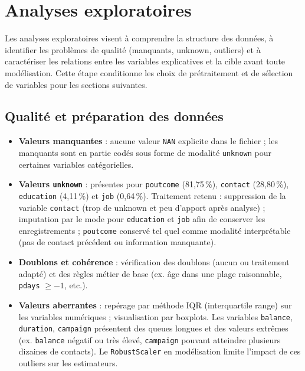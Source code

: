 \documentclass[11pt,a4paper]{article}
\begin{document}
\section{Analyses exploratoires}

Les analyses exploratoires visent à comprendre la structure des données, à identifier les problèmes de qualité (manquants, unknown, outliers) et à caractériser les relations entre les variables explicatives et la cible avant toute modélisation. Cette étape conditionne les choix de prétraitement et de sélection de variables pour les sections suivantes.

\subsection{Qualité et préparation des données}
\begin{itemize}
  \item \textbf{Valeurs manquantes} : aucune valeur \texttt{NAN} explicite dans le fichier ; les manquants sont en partie codés sous forme de modalité \texttt{unknown} pour certaines variables catégorielles.
  \item \textbf{Valeurs \texttt{unknown}} : présentes pour \texttt{poutcome} (81,75\,\%), \texttt{contact} (28,80\,\%), \texttt{education} (4,11\,\%) et \texttt{job} (0,64\,\%). Traitement retenu : suppression de la variable \texttt{contact} (trop de unknown et peu d'apport après analyse) ; imputation par le mode pour \texttt{education} et \texttt{job} afin de conserver les enregistrements ; \texttt{poutcome} conservé tel quel comme modalité interprétable (pas de contact précédent ou information manquante).
  \item \textbf{Doublons et cohérence} : vérification des doublons (aucun ou traitement adapté) et des règles métier de base (ex. âge dans une plage raisonnable, \texttt{pdays} $\geq -1$, etc.).
  \item \textbf{Valeurs aberrantes} : repérage par méthode IQR (interquartile range) sur les variables numériques ; visualisation par boxplots. Les variables \texttt{balance}, \texttt{duration}, \texttt{campaign} présentent des queues longues et des valeurs extrêmes (ex. \texttt{balance} négatif ou très élevé, \texttt{campaign} pouvant atteindre plusieurs dizaines de contacts). Le \texttt{RobustScaler} en modélisation limite l'impact de ces outliers sur les estimateurs.
\end{itemize}
\end{document}
